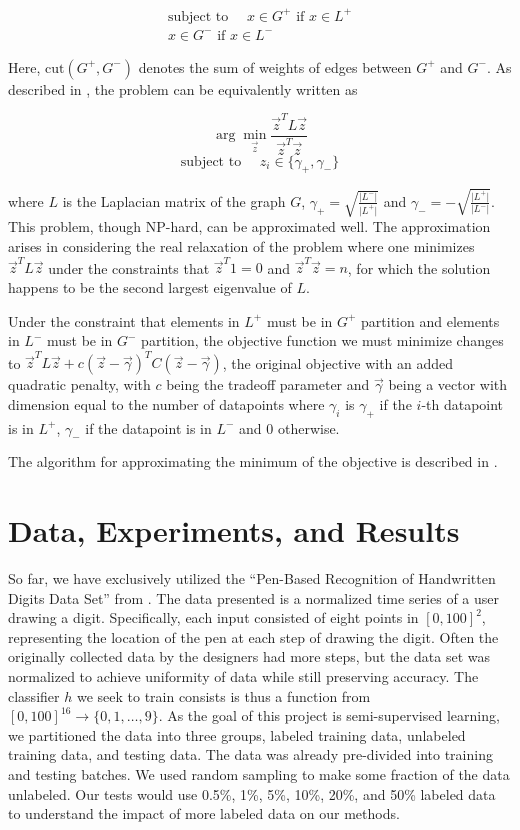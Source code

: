 \documentclass[11pt]{article}
\begin{document}
\begin{align*}
\text{subject to }\quad x\in G^+\text{ if }x\in L^+\\
x\in G^-\text{ if }x\in L^-
\end{align*}

Here, $\mathrm{cut}(G^+, G^-)$ denotes the sum of weights of
edges between $G^+$ and $G^-$. As described in \cite{dhillon2001co}, the problem can be equivalently written as

\[\arg\min_{\vec{z}}\frac{\vec{z}^T L\vec{z}}{\vec{z}^T\vec{z}}\]
\[\text{subject to }\quad z_i\in\{\gamma_+,\gamma_-\}\]

where $L$ is the Laplacian matrix of the graph $G$,
$\gamma_+=\sqrt{\frac{\lvert L^-\rvert}{\lvert L^+\rvert}}$
and $\gamma_-=-\sqrt{\frac{\lvert L^+\rvert}{\lvert L^-\rvert}}$.
This problem, though NP-hard, can
be approximated well. The approximation arises in considering the real relaxation of the problem where one minimizes $\vec{z}^TL\vec{z}$
under the constraints that $\vec{z}^T1=0$ and $\vec{z}^T\vec{z}=n$,
for which the solution happens to be the second largest eigenvalue of
$L$.

Under the constraint that elements in $L^+$ must be in $G^+$
partition and elements in $L^-$ must be in $G^-$ partition,
the objective function we must minimize changes to
$\vec{z}^TL\vec{z}+c(\vec{z}-\vec{\gamma})^TC(\vec{z}-\vec{\gamma})$,
the original objective with an added quadratic penalty, with $c$
being the tradeoff parameter and $\vec{\gamma}$ being a vector
with dimension equal to the number of datapoints where $\gamma_i$
is $\gamma_+$ if the $i$-th datapoint is in $L^+$, $\gamma_-$
if the datapoint is in $L^-$ and 0 otherwise.

The algorithm for approximating the minimum of the objective is described
in \cite{joachims2003transductive}.

\section{Data, Experiments, and Results}

So far, we have exclusively utilized the ``Pen-Based Recognition of Handwritten Digits Data Set'' from \cite{Alpaydin:1998}. The data presented is a normalized time series of a user drawing a digit. Specifically, each input consisted of eight points in $[0, 100]^2$, representing the location of the pen at each step of drawing the digit. Often the originally collected data by the designers had more steps, but the data set was normalized to achieve uniformity of data while still preserving accuracy. The classifier $h$ we seek to train consists is thus a function from $[0, 100]^{16} \to \{0, 1, \hdots, 9\}$.  As the goal of this project is semi-supervised learning, we partitioned the data into three groups, labeled training data, unlabeled training data, and testing data. The data was already pre-divided into training and testing batches. We used random sampling to make some fraction of the data unlabeled. Our tests would use 0.5\%, 1\%, 5\%, 10\%, 20\%, and 50\% labeled data to understand the impact of more labeled data on our methods.
\end{document}
